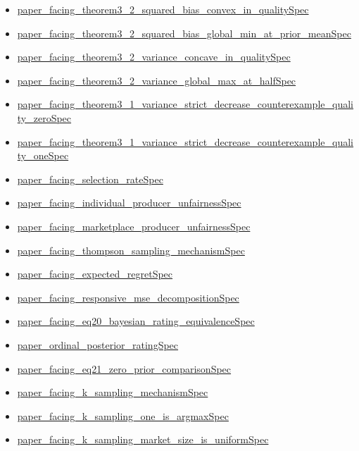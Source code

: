 \documentclass[10pt]{article}
\begin{document}
\begin{itemize}[leftmargin=1.2em]
\begin{itemize}[leftmargin=1.2em]
\item \hyperlink{source-claim-2dcf6dbcf162b5d0}{paper\_facing\_theorem3\_2\_squared\_bias\_convex\_in\_qualitySpec}
\item \hyperlink{source-claim-444ef89e21ba4476}{paper\_facing\_theorem3\_2\_squared\_bias\_global\_min\_at\_prior\_meanSpec}
\item \hyperlink{source-claim-3afe5de598f0ed9d}{paper\_facing\_theorem3\_2\_variance\_concave\_in\_qualitySpec}
\item \hyperlink{source-claim-a4656e58047f308c}{paper\_facing\_theorem3\_2\_variance\_global\_max\_at\_halfSpec}
\item \hyperlink{source-claim-6ce0e529b89e57b7}{paper\_facing\_theorem3\_1\_variance\_strict\_decrease\_counterexample\_quality\_zeroSpec}
\item \hyperlink{source-claim-464dc3b105b500a1}{paper\_facing\_theorem3\_1\_variance\_strict\_decrease\_counterexample\_quality\_oneSpec}
\item \hyperlink{source-claim-5e3bedb3cf1d62b0}{paper\_facing\_selection\_rateSpec}
\item \hyperlink{source-claim-430cb3de083df7cf}{paper\_facing\_individual\_producer\_unfairnessSpec}
\item \hyperlink{source-claim-aace03b9ed863bb2}{paper\_facing\_marketplace\_producer\_unfairnessSpec}
\item \hyperlink{source-claim-f5087ebba0ec2e7e}{paper\_facing\_thompson\_sampling\_mechanismSpec}
\item \hyperlink{source-claim-9acd03585d100ede}{paper\_facing\_expected\_regretSpec}
\item \hyperlink{source-claim-7a7d1cda2bb14e73}{paper\_facing\_responsive\_mse\_decompositionSpec}
\item \hyperlink{source-claim-8281b9d563b2f959}{paper\_facing\_eq20\_bayesian\_rating\_equivalenceSpec}
\item \hyperlink{source-claim-48bd38a1dccb3b5f}{paper\_ordinal\_posterior\_ratingSpec}
\item \hyperlink{source-claim-c141e929e91e7be9}{paper\_facing\_eq21\_zero\_prior\_comparisonSpec}
\item \hyperlink{source-claim-c0449d6c0ae69374}{paper\_facing\_k\_sampling\_mechanismSpec}
\item \hyperlink{source-claim-03b433e77eab6bcb}{paper\_facing\_k\_sampling\_one\_is\_argmaxSpec}
\item \hyperlink{source-claim-48e4400514808bc7}{paper\_facing\_k\_sampling\_market\_size\_is\_uniformSpec}
\end{itemize}
\end{itemize}
\end{document}
